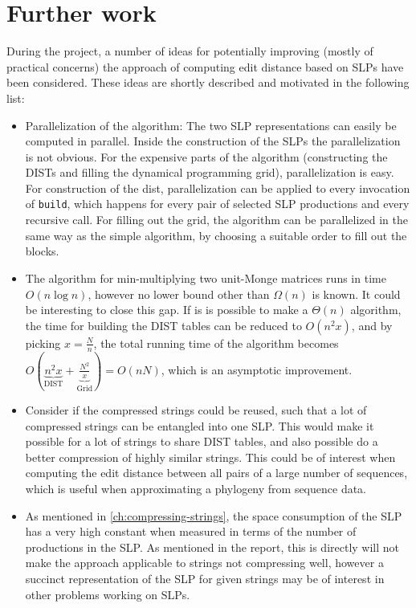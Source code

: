 \documentclass[twoside,11pt,openright]{report}
\newcommand{\DIST}{\operatorname{DIST}}
\begin{document}
\section{Further work}
\label{sec:conclusion:further-work}
During the project, a number of ideas for potentially improving (mostly of practical concerns) the approach of computing edit distance based on SLPs have been considered. These ideas are shortly described and motivated in the following list:

\begin{itemize}
  \item Parallelization of the algorithm: The two SLP representations can easily be computed in parallel. Inside the construction of the SLPs the parallelization is not obvious.
  For the expensive parts of the algorithm (constructing the DISTs and filling the dynamical programming grid), parallelization is easy. For construction of the dist, parallelization can be applied to every invocation of \texttt{build}, which happens for every pair of selected SLP productions and every recursive call.
  For filling out the grid, the algorithm can be parallelized in the same way as the simple algorithm, by choosing a suitable order to fill out the blocks.

  \item The algorithm for min-multiplying two unit-Monge matrices runs in time $O(n \log{n})$, however no lower bound other than $\Omega(n)$ is known. It could be interesting to close this gap. If is is possible to make a $\Theta(n)$ algorithm, the time for building the DIST tables can be reduced to $O(n^2 x)$, and by picking $x = \frac{N}{n}$, the total running time of the algorithm becomes $O(\underbrace{n^2 x}_{\DIST} + \underbrace{\frac{N^2}{x}}_{\text{Grid}}) = O(nN)$, which is an asymptotic improvement.

  \item Consider if the compressed strings could be reused, such that a lot of compressed strings can be entangled into one SLP. This would make it possible for a lot of strings to share DIST tables, and also possible do a better compression of highly similar strings. This could be of interest when computing the edit distance between all pairs of a large number of sequences, which is useful when approximating a phylogeny from sequence data.

  \item As mentioned in \cref{ch:compressing-strings}, the space consumption of the SLP has a very high constant when measured in terms of the number of productions in the SLP. As mentioned in the report, this is directly will not make the approach applicable to strings not compressing well, however a succinct representation of the SLP for given strings may be of interest in other problems working on SLPs.
\end{itemize}


 

\end{document}
